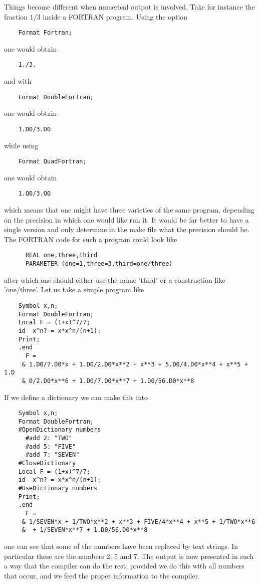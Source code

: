 Things become different when numerical output is 
involved. Take for instance the fraction $1/3$ inside a 
FORTRAN program. 
Using the option
\begin{verbatim}
    Format Fortran;
\end{verbatim}
one would obtain
\begin{verbatim}
    1./3.
\end{verbatim}
and with
\begin{verbatim}
    Format DoubleFortran;
\end{verbatim}
one would obtain
\begin{verbatim}
    1.D0/3.D0
\end{verbatim}
while using
\begin{verbatim}
    Format QuadFortran;
\end{verbatim}
one would obtain
\begin{verbatim}
    1.Q0/3.Q0
\end{verbatim}
which means that one might have three varieties of the same program, 
depending on the precision in which one would like run it. It would be far 
better to have a single version and only determine in the make file what 
the precision should be. The FORTRAN code for such a program could look 
like
\begin{verbatim}
      REAL one,three,third
      PARAMETER (one=1,three=3,third=one/three)
\end{verbatim}
after which one should either use the name 'third' or a construction like 
'one/three'. Let us take a simple program like
\begin{verbatim}
    Symbol x,n;
    Format DoubleFortran;
    Local F = (1+x)^7/7;
    id	x^n? = x*x^n/(n+1);
    Print;
    .end
      F =
     & 1.D0/7.D0*x + 1.D0/2.D0*x**2 + x**3 + 5.D0/4.D0*x**4 + x**5 + 1.D
     & 0/2.D0*x**6 + 1.D0/7.D0*x**7 + 1.D0/56.D0*x**8
\end{verbatim}
If we define a dictionary we can make this into
\begin{verbatim}
    Symbol x,n;
    Format DoubleFortran;
    #OpenDictionary numbers
      #add 2: "TWO"
      #add 5: "FIVE"
      #add 7: "SEVEN"
    #CloseDictionary
    Local F = (1+x)^7/7;
    id	x^n? = x*x^n/(n+1);
    #UseDictionary numbers
    Print;
    .end
      F =
     & 1/SEVEN*x + 1/TWO*x**2 + x**3 + FIVE/4*x**4 + x**5 + 1/TWO*x**6
     &  + 1/SEVEN*x**7 + 1.D0/56.D0*x**8
\end{verbatim}
one can see that some of the numbers have been replaced by text strings. In 
particular these are the numbers 2, 5 and 7. The output is now presented in 
such a way that the compiler can do the rest, provided we do this with all 
numbers that occur, and we feed the proper information to the compiler.

